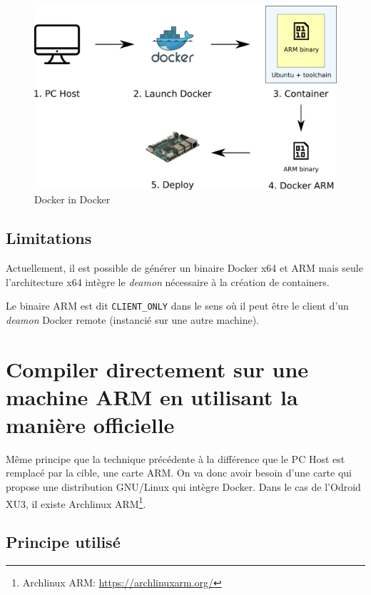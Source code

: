 \documentclass[11pt,a4paper,oneside]{report}
\newcommand{\code}[1]{\texttt{#1}} %
\begin{document}
\begin{figure}[H]
    \begin{center}
        \includegraphics[scale=0.5]{img/docker_in_docker}
    \end{center}
    \caption{Docker in Docker}
    \label{fig_docker_in_docker}
\end{figure}

\subsection{Limitations}\label{maniere_officielle_limitations}

Actuellement, il est possible de générer un binaire Docker x64 et ARM mais seule l'architecture x64 intègre le \emph{deamon} nécessaire à la création de containers.

Le binaire ARM est dit \code{CLIENT\_ONLY} dans le sens où il peut être le client d'un \emph{deamon} Docker remote (instancié sur une autre machine).


\section{Compiler directement sur une machine ARM en utilisant la manière officielle}

Même principe que la technique précédente à la différence que le PC Host est remplacé par la cible, une carte ARM. On va donc avoir besoin d'une carte qui propose une distribution GNU/Linux qui intègre Docker. Dans le cas de l'Odroid XU3, il existe Archlinux ARM\footnote{Archlinux ARM: \url{https://archlinuxarm.org/}}.

\subsection{Principe utilisé}
\end{document}
